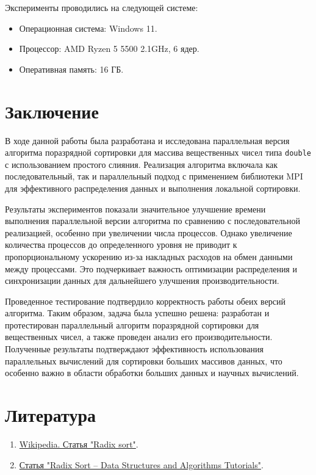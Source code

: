 \documentclass[12pt]{article}
\begin{document}
	Эксперименты проводились на следующей системе: \begin{itemize} \item Операционная система: Windows 11. \item Процессор: AMD Ryzen 5 5500 2.1GHz, 6 ядер. \item Оперативная память: 16 ГБ. \end{itemize}
	
	\newpage
	
	\section*{Заключение}
	
	\hspace*{1.25em}В ходе данной работы была разработана и исследована параллельная версия алгоритма поразрядной сортировки для массива вещественных чисел типа \texttt{double} с использованием простого слияния. Реализация алгоритма включала как последовательный, так и параллельный подход с применением библиотеки MPI для эффективного распределения данных и выполнения локальной сортировки.
	
	Результаты экспериментов показали значительное улучшение времени выполнения параллельной версии алгоритма по сравнению с последовательной реализацией, особенно при увеличении числа процессов. Однако увеличение количества процессов до определенного уровня не приводит к пропорциональному ускорению из-за накладных расходов на обмен данными между процессами. Это подчеркивает важность оптимизации распределения и синхронизации данных для дальнейшего улучшения производительности.
	
	Проведенное тестирование подтвердило корректность работы обеих версий алгоритма. Таким образом, задача была успешно решена: разработан и протестирован параллельный алгоритм поразрядной сортировки для вещественных чисел, а также проведен анализ его производительности. Полученные результаты подтверждают эффективность использования параллельных вычислений для сортировки больших массивов данных, что особенно важно в области обработки больших данных и научных вычислений.
	
	\newpage
	
	\section*{Литература}
	
	\begin{enumerate}
		\item \href{https://en.wikipedia.org/wiki/Radix_sort}{Wikipedia. Статья "Radix sort"}.
		\item \href{https://www.geeksforgeeks.org/radix-sort/}{Статья "Radix Sort – Data Structures and Algorithms Tutorials"}.
	\end{enumerate}
	
\end{document}
